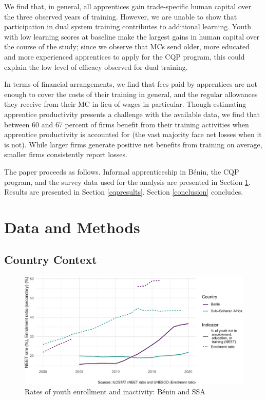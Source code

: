 \documentclass[
  a4paper, twoside, 12pt]{book}
\begin{document}
We find that, in general, all apprentices gain trade-specific human capital over the three observed years of training. However, we are unable to show that participation in dual system training contributes to additional learning. Youth with low learning scores at baseline make the largest gains in human capital over the course of the study; since we observe that MCs send older, more educated and more experienced apprentices to apply for the CQP program, this could explain the low level of efficacy observed for dual training.

In terms of financial arrangements, we find that fees paid by apprentices are not enough to cover the costs of their training in general, and the regular allowances they receive from their MC in lieu of wages in particular. Though estimating apprentice productivity presents a challenge with the available data, we find that between 60 and 67 percent of firms benefit from their training activities when apprentice productivity is accounted for (the vast majority face net losses when it is not). While larger firms generate positive net benefits from training on average, smaller firms consistently report losses.

The paper proceeds as follows. Informal apprenticeship in Bénin, the CQP program, and the survey data used for the analysis are presented in Section \ref{data}. Results are presented in Section \ref{cqpresults}. Section \ref{conclusion} concludes.

\hypertarget{data}{%
\section{Data and Methods}\label{data}}

\hypertarget{country-context}{%
\subsection{Country Context}\label{country-context}}

\begin{figure}[H]
\includegraphics{figures/fig-enrollment-1} \caption{Rates of youth enrollment and inactivity: Bénin and SSA}\label{fig:fig-enrollment}
\end{figure}
\end{document}
